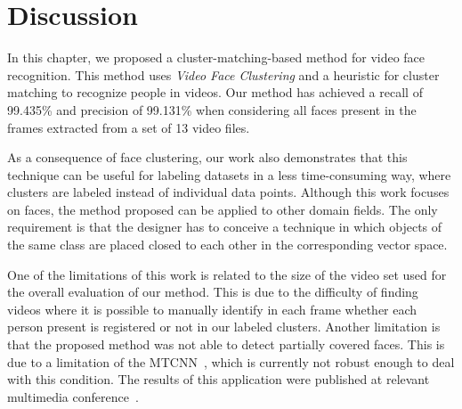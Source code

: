\section{Discussion}
\label{sec:recognition_discussion}

In this chapter, we proposed a cluster-matching-based method for video face recognition. 
This method uses \emph{Video Face Clustering} and a heuristic for cluster matching to recognize people in videos. 
Our method has achieved a recall of 99.435\% and precision of 99.131\% when considering all faces present in the frames extracted from a set of 13 video files.  

As a consequence of face clustering, our work also demonstrates that this technique can be useful for labeling datasets in a less time-consuming way, where clusters are labeled instead of individual data points.
Although this work focuses on faces, the method proposed can be applied to other domain fields.
The only requirement is that the designer has to conceive a technique in which objects of the same class are placed closed to each other in the corresponding vector space.

One of the limitations of this work is related to the size of the video set used for the overall evaluation of our method. 
This is due to the difficulty of finding videos where it is possible to manually identify in each frame whether each person present is registered or not in our labeled clusters.
Another limitation is that the proposed method was not able to detect partially covered faces. 
This is due to a limitation of the MTCNN~\cite{mtcnn}, which is currently not robust enough to deal with this condition.
The results of this application were published at relevant multimedia conference~\cite{mendes2020cluster}.
